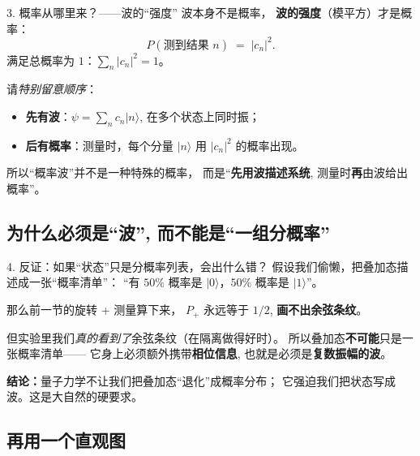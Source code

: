 \documentclass[11pt,a4paper]{ctexart}
\begin{document}
\begin{stepblock}{3. 概率从哪里来？——波的``强度''}
波本身不是概率，
\textbf{波的强度}（模平方）才是概率：
\[
  P(\text{测到结果 }n) \;=\; |c_n|^2.
\]
满足总概率为 $1$：$\sum_n |c_n|^2 = 1$。
\smallskip

请\emph{特别留意顺序}：
\begin{itemize}
  \item \textbf{先有波}：$\psi = \sum_n c_n\lvert n\rangle$, 在多个状态上同时振；
  \item \textbf{后有概率}：测量时，每个分量 $\lvert n\rangle$ 用 $|c_n|^2$ 的概率出现。
\end{itemize}
所以``概率波''并不是一种特殊的概率，
而是``\textbf{先用波描述系统}, 测量时\textbf{再}由波给出概率''。
\end{stepblock}

\subsection{为什么必须是``波'', 而不能是``一组分概率''}

\begin{stepblock}{4. 反证：如果``状态''只是分概率列表，会出什么错？}
假设我们偷懒，把叠加态描述成一张``概率清单''：
``有 $50\%$ 概率是 $\lvert 0\rangle$，$50\%$ 概率是 $\lvert 1\rangle$''。
\smallskip

那么前一节的旋转 + 测量算下来，
$P_+$ 永远等于 $1/2$, \textbf{画不出余弦条纹}。
\smallskip

但实验里我们\emph{真的看到了}余弦条纹（在隔离做得好时）。
所以叠加态\textbf{不可能}只是一张概率清单——
它身上必须额外携带\textbf{相位信息}, 也就是必须是\textbf{复数振幅的波}。

\smallskip
\textbf{结论：}量子力学不让我们把叠加态``退化''成概率分布；
它强迫我们把状态写成波。这是大自然的硬要求。
\end{stepblock}

\subsection{再用一个直观图}
\end{document}
